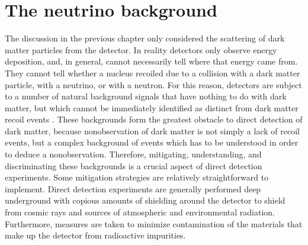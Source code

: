 \documentclass[b5paper, 10pt, twoside]{book}
\renewcommand{\vec}[1]{\symbfit{#1}}
\begin{document}



\chapter{The neutrino background}
\label{chap:background}

The discussion in the previous chapter only considered the scattering of dark matter particles from the detector. In reality detectors only observe energy deposition, and, in general, cannot necessarily tell where that energy came from. They cannot tell whether a nucleus recoiled due to a collision with a dark matter particle, with a neutrino, or with a neutron. For this reason, detectors are subject to a number of natural background signals that have nothing to do with dark matter, but which cannot be immediately identified as distinct from dark matter recoil events \parencite{BaxterEtAl2022}. These backgrounds form the greatest obstacle to direct detection of dark matter, because nonobservation of dark matter is not simply a lack of recoil events, but a complex background of events which has to be understood in order to deduce a nonobservation. Therefore, mitigating, understanding, and discriminating these backgrounds is a crucial aspect of direct detection experiments. Some mitigation strategies are relatively straightforward to implement. Direct detection experiments are generally performed deep underground with copious amounts of shielding around the detector to shield from cosmic rays and sources of atmospheric and environmental radiation. Furthermore, measures are taken to minimize contamination of the materials that make up the detector from radioactive impurities.
\end{document}

